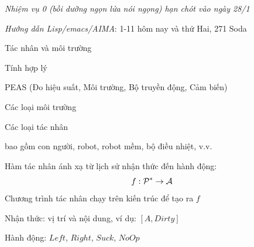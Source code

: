 \documentclass{article}
\begin{document}
\begin{huge}

\sf



\emph{Nhiệm vụ 0 (bồi dưỡng ngọn lửa nói ngọng) hạn chót vào ngày 28/1}

\emph{Hướng dẫn Lisp/emacs/AIMA}: 1-11 hôm nay và thứ Hai, 271 Soda





\blob Tác nhân và môi trường

\blob Tính hợp lý

\blob PEAS (Đo hiệu suất, Môi trường, Bộ truyền động, Cảm biến)

\blob Các loại môi trường

\blob Các loại tác nhân


\textwidth
{}

 bao gồm con người, robot, robot mềm, bộ điều nhiệt, v.v.

Hàm tác nhân  ánh xạ từ lịch sử nhận thức đến hành động:
\[f: {\cal P}^* \rightarrow {\cal A}\]
Chương trình tác nhân  chạy trên kiến trúc  để tạo ra $f$




\vspace*{0.3in}

\textwidth
{}

Nhận thức: vị trí và nội dung, ví dụ: $[A,Dirty]$

Hành động: $Left$, $Right$, $Suck$, $NoOp$


%

\medskip




\end{huge}
\end{document}
